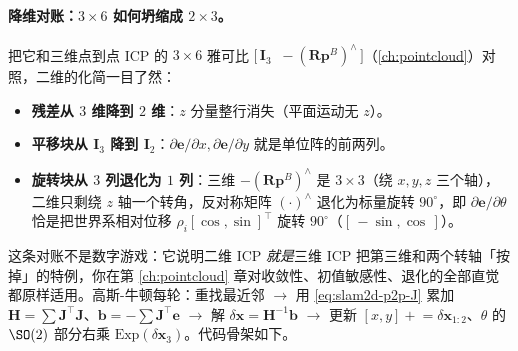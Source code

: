 \paragraph{降维对账：$3\times 6$ 如何坍缩成 $2\times 3$。}
把它和三维点到点 ICP 的 $3\times 6$ 雅可比 $\big[\,\mathbf{I}_3\;\;-(\mathbf{R}\mathbf{p}^B)^\wedge\,\big]$（\cref{ch:pointcloud}）对照，二维的化简一目了然：
\begin{itemize}
  \item \textbf{残差从 $3$ 维降到 $2$ 维}：$z$ 分量整行消失（平面运动无 $z$）。
  \item \textbf{平移块从 $\mathbf{I}_3$ 降到 $\mathbf{I}_2$}：$\partial\mathbf{e}/\partial x,\partial\mathbf{e}/\partial y$ 就是单位阵的前两列。
  \item \textbf{旋转块从 $3$ 列退化为 $1$ 列}：三维 $-(\mathbf{R}\mathbf{p}^B)^\wedge$ 是 $3\times 3$（绕 $x,y,z$ 三个轴），二维只剩绕 $z$ 轴一个转角，反对称矩阵 $(\cdot)^\wedge$ 退化为标量旋转 $90^\circ$，即 $\partial\mathbf{e}/\partial\theta$ 恰是把世界系相对位移 $\rho_i[\cos,\sin]^\top$ 旋转 $90^\circ$（$[\,-\sin,\cos\,]$）。
\end{itemize}
这条对账不是数字游戏：它说明二维 ICP \emph{就是}三维 ICP 把第三维和两个转轴「按掉」的特例，你在第 \cref{ch:pointcloud} 章对收敛性、初值敏感性、退化的全部直觉都原样适用。高斯-牛顿每轮：重找最近邻 $\to$ 用 \cref{eq:slam2d-p2p-J} 累加 $\mathbf{H}=\sum\mathbf{J}^\top\mathbf{J}$、$\mathbf{b}=-\sum\mathbf{J}^\top\mathbf{e}$ $\to$ 解 $\delta\mathbf{x}=\mathbf{H}^{-1}\mathbf{b}$ $\to$ 更新 $[x,y]\mathrel{+}=\delta\mathbf{x}_{1:2}$、$\theta$ 的 $\SO(2)$ 部分右乘 $\mathrm{Exp}(\delta\mathbf{x}_3)$。代码骨架如下。

